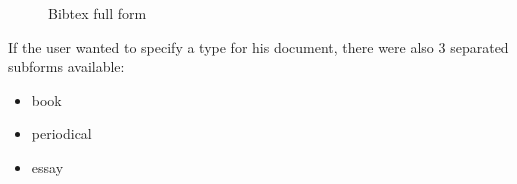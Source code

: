 \begin{figure}[!h]
  \centering
  \caption{Bibtex full form}
  \label{fig:Bibtex_full_form}
\end{figure}

If the user wanted to specify a type for his document, there were also 3 separated subforms available:

\begin{itemize}
\item book
\item periodical
\item essay
\end{itemize}

